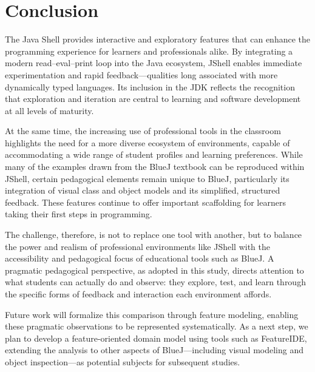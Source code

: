 \documentclass{article}
\begin{document}
\section{Conclusion}

The Java Shell provides interactive and exploratory features that can enhance the programming experience for learners and professionals alike. By integrating a modern read–eval–print loop into the Java ecosystem, JShell enables immediate experimentation and rapid feedback—qualities long associated with more dynamically typed languages. Its inclusion in the JDK reflects the recognition that exploration and iteration are central to learning and software development at all levels of maturity.

At the same time, the increasing use of professional tools in the classroom highlights the need for a more diverse ecosystem of environments, capable of accommodating a wide range of student profiles and learning preferences. While many of the examples drawn from the BlueJ textbook can be reproduced within JShell, certain pedagogical elements remain unique to BlueJ, particularly its integration of visual class and object models and its simplified, structured feedback. These features continue to offer important scaffolding for learners taking their first steps in programming.

The challenge, therefore, is not to replace one tool with another, but to balance the power and realism of professional environments like JShell with the accessibility and pedagogical focus of educational tools such as BlueJ. A pragmatic pedagogical perspective, as adopted in this study, directs attention to what students can actually do and observe: they explore, test, and learn through the specific forms of feedback and interaction each environment affords.

Future work will formalize this comparison through feature modeling, enabling these pragmatic observations to be represented systematically. As a next step, we plan to develop a feature-oriented domain model using tools such as FeatureIDE, extending the analysis to other aspects of BlueJ—including visual modeling and object inspection—as potential subjects for subsequent studies.


\end{document}
